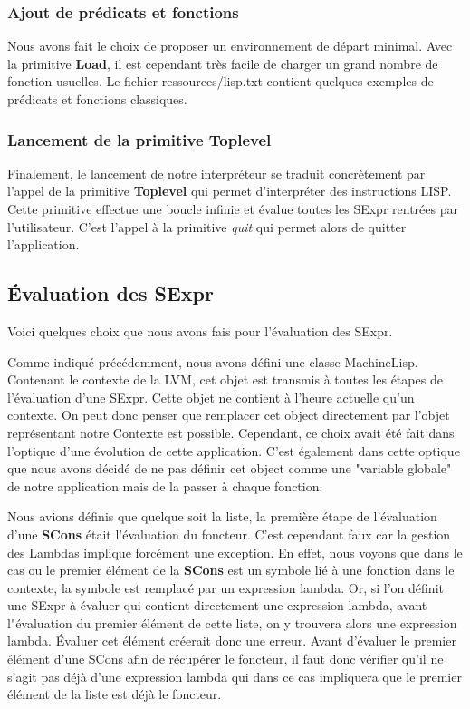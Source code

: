 \documentclass[a4paper, 11pt]{article}
\numberwithin{equation}{section}
\theoremstyle{definition}
\begin{document}
\subsubsection{Ajout de prédicats et fonctions}

Nous avons fait le choix de proposer un environnement de départ minimal. Avec la primitive {\bfseries Load}, il est cependant très facile de charger un grand nombre de fonction usuelles. Le fichier ressources/lisp.txt contient quelques exemples de prédicats et fonctions classiques.

\subsubsection{Lancement de la primitive Toplevel}

Finalement, le lancement de notre interpréteur se traduit concrètement par l'appel de la primitive {\bfseries Toplevel} qui permet d'interpréter des instructions LISP. Cette primitive effectue une boucle infinie et évalue toutes les SExpr rentrées par l'utilisateur. C'est l'appel à la primitive \textit{quit} qui permet alors de quitter l'application.

\subsection{Évaluation des SExpr}

Voici quelques choix que nous avons fais pour l'évaluation des SExpr.

Comme indiqué précédemment, nous avons défini une classe MachineLisp. Contenant le contexte de la LVM, cet objet est transmis à toutes les étapes de l'évaluation d'une SExpr. Cette objet ne contient à l'heure actuelle qu'un contexte. On peut donc penser que remplacer cet object directement par l'objet représentant notre Contexte est possible. Cependant, ce choix avait été fait dans l'optique d'une évolution de cette application. C'est également dans cette optique que nous avons décidé de ne pas définir cet object comme une "variable globale" de notre application mais de la passer à chaque fonction.


Nous avions définis que quelque soit la liste, la première étape de l'évaluation d'une {\bfseries SCons} était l'évaluation du foncteur. C'est cependant faux car la gestion des Lambdas implique forcément une exception. En effet, nous voyons que dans le cas ou le premier élément de la {\bfseries SCons} est un symbole lié à une fonction dans le contexte, la symbole est remplacé par un expression lambda. Or, si l'on définit une SExpr à évaluer qui contient directement une expression lambda, avant l"évaluation du premier élément de cette liste, on y trouvera alors une expression lambda. Évaluer cet élément créerait donc une erreur. Avant d'évaluer le premier élément d'une SCons afin de récupérer le foncteur, il faut donc vérifier qu'il ne s'agit pas déjà d'une expression lambda qui dans ce cas impliquera que le premier élément de la liste est déjà le foncteur.
\end{document}
